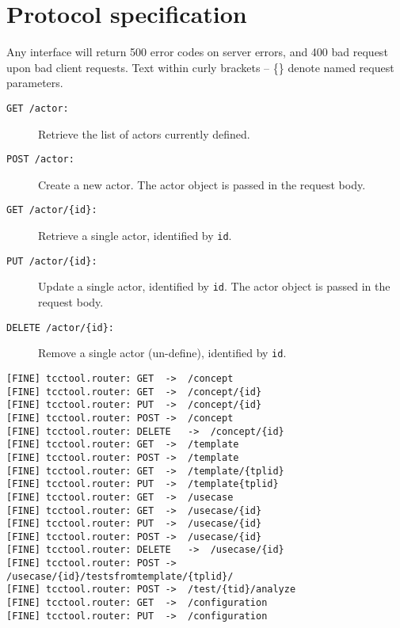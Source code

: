 \chapter{Protocol specification}
Any interface will return 500 error codes on server errors, and 400 bad request upon bad client requests. Text within curly brackets -- \{\} denote named request parameters.
\begin{description}
  \item[\texttt{GET /actor:}] Retrieve the list of actors currently defined.
  \item[\texttt{POST /actor:}] Create a new actor. The actor object is passed in the request body.
  \item[\texttt{GET /actor/\{id\}:}] Retrieve a single actor, identified by \texttt{id}.
  \item[\texttt{PUT /actor/\{id\}:}] Update a single actor, identified by \texttt{id}. The actor object is passed in the request body.
  \item[\texttt{DELETE /actor/\{id\}:}] Remove a single actor (un-define), identified by \texttt{id}.
\end{description}
\begin{verbatim}
[FINE] tcctool.router: GET	->	/concept
[FINE] tcctool.router: GET	->	/concept/{id}
[FINE] tcctool.router: PUT	->	/concept/{id}
[FINE] tcctool.router: POST	->	/concept
[FINE] tcctool.router: DELETE	->	/concept/{id}
[FINE] tcctool.router: GET	->	/template
[FINE] tcctool.router: POST	->	/template
[FINE] tcctool.router: GET	->	/template/{tplid}
[FINE] tcctool.router: PUT	->	/template{tplid}
[FINE] tcctool.router: GET	->	/usecase
[FINE] tcctool.router: GET	->	/usecase/{id}
[FINE] tcctool.router: PUT	->	/usecase/{id}
[FINE] tcctool.router: POST	->	/usecase/{id}
[FINE] tcctool.router: DELETE	->	/usecase/{id}
[FINE] tcctool.router: POST	->	/usecase/{id}/testsfromtemplate/{tplid}/
[FINE] tcctool.router: POST	->	/test/{tid}/analyze
[FINE] tcctool.router: GET	->	/configuration
[FINE] tcctool.router: PUT	->	/configuration
\end{verbatim}